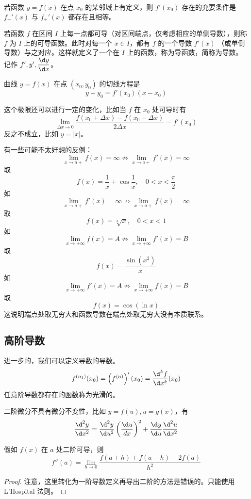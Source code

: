 \begin{theorem}
	若函数 $y=f(x)$ 在点 $x_0$ 的某邻域上有定义，则 $f'(x_0)$ 存在的充要条件是 $f_-'(x)$ 与 $f_+'(x)$ 都存在且相等。
\end{theorem}

若函数 $f$ 在区间 $I$ 上每一点都可导（对区间端点，仅考虑相应的单侧导数），则称 $f$ 为 $I$ 上的可导函数。此时对每一个 $x\in I$，都有 $f$ 的一个导数 $f'(x)$ （或单侧导数）与之对应。这样就定义了一个在 $I$ 上的函数，称为导函数，简称为导数。记作 $f',y',\dfrac{\d y}{\d x}$。

曲线 $y = f(x)$ 在点 $(x_0,y_0)$ 的切线方程是
\[ y-y_0 = f'(x_0)(x-x_0) \]

这个极限还可以进行一定的变化，比如当 $f$ 在 $x_0$ 处可导时有
\[ \lim_{\Delta x \to 0} \frac{f(x_0 + \Delta x) - f(x_0 - \Delta x)}{2 \Delta x} = f'(x_0) \]
反之不成立，比如 $y = |x|$。

有一些可能不太好想的反例：
\[ \lim_{x \to a+} f(x) = \infty \not\Rightarrow \lim_{x \to a+} f'(x) = \infty \]
取
\[ f(x) = \frac{1}{x} + \cos \frac{1}{x}, \quad 0 < x < \frac{\pi}{2} \]
如
\[ \lim_{x \to a+} f'(x) = \infty \not\Rightarrow \lim_{x \to a+} f(x) = \infty \]
取
\[ f(x) = \sqrt[3]{x}, \quad 0 < x < 1 \]
如
\[ \lim_{x \to +\infty} f(x) = A \not\Rightarrow \lim_{x \to +\infty} f'(x) = B \]
取
\[ f(x) = \frac{\sin(x^2)}{x} \]
如
\[ \lim_{x \to +\infty} f'(x) = A \not\Rightarrow \lim_{x \to +\infty} f(x) = B \]
取
\[ f(x) = \cos(\ln x) \]
这说明端点处取无穷大和函数导数在端点处取无穷大没有本质联系。

\subsection{高阶导数}

进一步的，我们可以定义导数的导数。
\[ f^{(n_1)}(x_0) = \left(f^{(n)}\right)' (x_0) = \frac{\d^k f}{\d x^k}(x_0) \]
任意阶导数都存在的函数称为光滑的。

二阶微分不具有微分不变性，比如 $y = f(u), u = g(x)$，有
\[ \frac{\d^2 y}{\d x^2} = \frac{\d^2 y}{\d u^2} \left(\frac{\d u}{d x}\right)^2 + \frac{\d y}{\d u} \frac{\d^2 u}{\d x^2} \]

\begin{theorem}
	假如 $f(x)$ 在 $a$ 处二阶可导，则
	\[ f''(a) = \lim_{h \to 0} \frac{f(a + h) + f(a - h) - 2f(a)}{h^2} \]
\end{theorem}

\begin{proof}
	注意，这里转化为一阶导数定义再导出二阶的方法是错误的。只能使用 L'Hospital 法则。
\end{proof}

